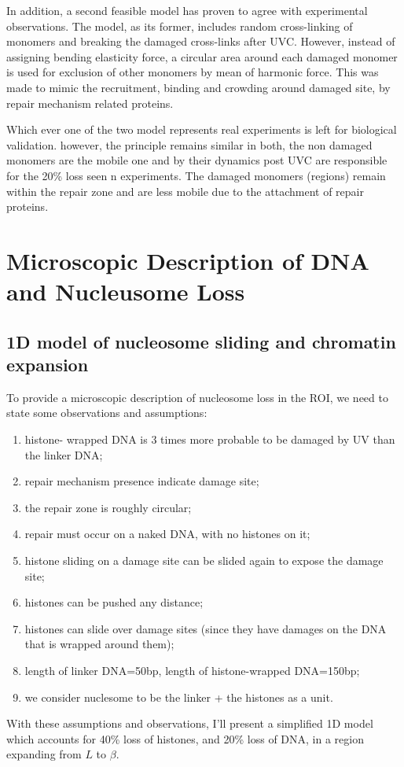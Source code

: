 \documentclass[12pt]{report}
\begin{document}
     In addition, a second feasible model has proven to agree with experimental observations. The model, as its former, includes random cross-linking of monomers and breaking the damaged cross-links after UVC. However, instead of assigning bending elasticity force, a circular area around each damaged monomer is used for exclusion of other monomers by mean of harmonic force. This was made to mimic the recruitment, binding and crowding around damaged site, by repair mechanism related proteins.
     
          
     Which ever one of the two model represents real experiments is left for biological validation. however, the principle remains similar in both, the non damaged monomers are the mobile one and by their dynamics post UVC are responsible for the 20\% loss seen n experiments. The damaged monomers (regions) remain within the repair zone and are less mobile due to the attachment of repair proteins. 
          
\section{Microscopic Description of DNA and Nucleusome Loss}
\subsection{1D model of nucleosome sliding and chromatin expansion}\label{subsection:1dModelOfNucleosomeSliding}
   To provide a microscopic description of nucleosome loss in the ROI, we need to state some observations and assumptions:
   \begin{enumerate}
   	\itemsep0em
   	\item histone- wrapped DNA is 3 times more probable to be damaged by UV than the linker DNA;
   	\item repair mechanism presence indicate damage site;
   	\item the repair zone is roughly circular;  
   	\item repair must occur on a naked DNA, with no histones on it; 
   	\item histone sliding on a damage site can be slided again to expose the damage site;
   	\item histones can be pushed any distance;
   	\item histones can slide over damage sites (since they have damages on the DNA that is wrapped around them);
   	\item length of linker DNA=50bp, length of histone-wrapped DNA=150bp;
   	\item we consider nuclesome to be the linker + the histones as a unit.   
   \end{enumerate}
   With these assumptions and observations, I'll present a simplified 1D model which accounts for 40\% loss of histones, and 20\% loss of DNA, in a region expanding from $L$ to $\beta$. 
   
\end{document}
